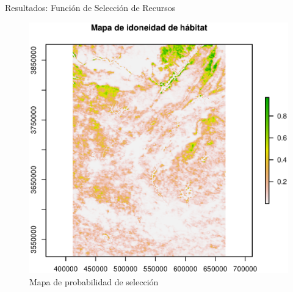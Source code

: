 \documentclass[11pt]{beamer}
\begin{document}
\begin{frame}{Resultados: Función de Selección de Recursos}

        \begin{figure}
            \includegraphics[scale=0.4]{images/idoneidad_habitat}
		\caption{Mapa de probabilidad de selección}
        \end{figure}
        
\end{frame}
\end{document}
